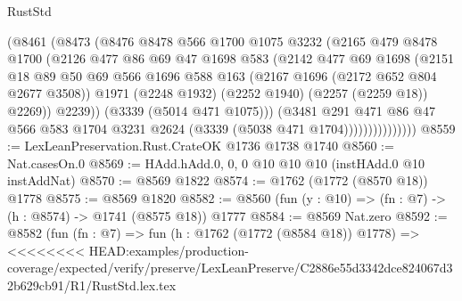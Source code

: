 \begin{lexlean}{RustStd}
\begin{coremodule}
{\begin{coremodule}
{{{{{{{{{{{{{{{                        (@8461
                          (@8473
                            (@8476
                              @8478
                              @566
                              @1700
                              @1075
                              @3232
                              (@2165
                                @479
                                @8478
                                @1700
                                (@2126
                                  @477
                                  @86
                                  @69
                                  @47
                                  @1698
                                  @583
                                  (@2142
                                    @477
                                    @69
                                    @1698
                                    (@2151
                                      @18
                                      @89
                                      @50
                                      @69
                                      @566
                                      @1696
                                      @588
                                      @163
                                      (@2167 @1696 (@2172 @652 @804 @2677 @3508))
                                      @1971
                                      (@2248 @1932)
                                      (@2252 @1940)
                                      (@2257 (@2259 @18))
                                      @2269))
                                  @2239))
                              (@3339 (@5014 @471 @1075)))
                            (@3481
                              @291
                              @471
                              @86
                              @47
                              @566
                              @583
                              @1704
                              @3231
                              @2624
                              (@3339 (@5038 @471 @1704)))))))))))))))
@8559 := LexLeanPreservation.Rust.CrateOK @1736 @1738 @1740
@8560 := Nat.casesOn.{0}
@8569 := HAdd.hAdd.{0, 0, 0} @10 @10 @10 (instHAdd.{0} @10 instAddNat)
@8570 := @8569 @1822
@8574 := @1762 (@1772 (@8570 @18)) @1778
@8575 := @8569 @1820
@8582 := @8560 (fun (y : @10) => (fn : @7) -> (h : @8574) -> @1741 (@8575 @18)) @1777
@8584 := @8569 Nat.zero
@8592 := @8582
    (fun (fn : @7) =>
    fun (h : @1762 (@1772 (@8584 @18)) @1778) =>
<<<<<<<< HEAD:examples/production-coverage/expected/verify/preserve/LexLeanPreserve/C2886e55d3342dce824067d32b629cb91/R1/RustStd.lex.tex
}}}}}}}}}}}}}}}
\end{coremodule}}
\end{coremodule}
\end{lexlean}
